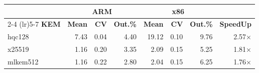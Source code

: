 \begin{table}[!ht]
\begin{tabular}{lrrr|rrr|r}
 \toprule
& \multicolumn{3}{c}{\bfseries ARM} & \multicolumn{3}{c}{\bfseries x86} &\\
\cmidrule(lr){2-4} \cmidrule(lr){5-7}
\textbf{KEM} & \textbf{Mean} & \textbf{CV} & \textbf{Out.\%} & \textbf{Mean} & \textbf{CV} & \textbf{Out.\%} & \textbf{SpeedUp}\\
\midrule
hqc128 & 7.43 & 0.04 & 4.40 & 19.12 & 0.10 & 9.76 & 2.57× \\
x25519 & 1.16 & 0.20 & 3.35 & 2.09 & 0.15 & 5.25 & 1.81× \\
mlkem512 & 1.16 & 0.22 & 2.80 & 2.04 & 0.15 & 6.25 & 1.76× \\
\bottomrule
\end{tabular}
\end{table}
